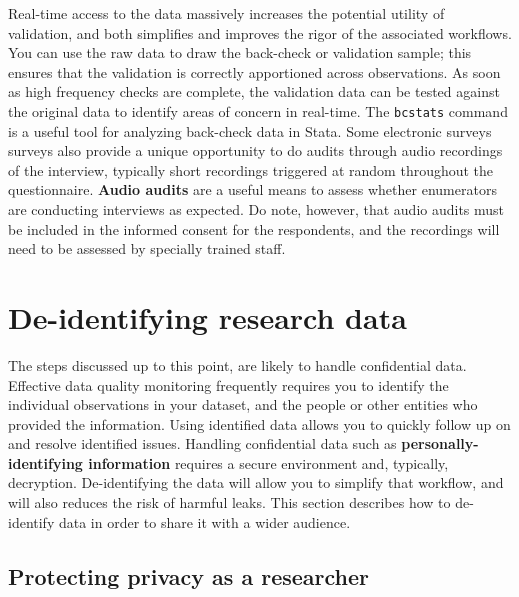 Real-time access to the data massively increases the potential utility of validation,
and both simplifies and improves the rigor of the associated workflows.
You can use the raw data to draw the back-check or validation sample;
this ensures that the validation is correctly apportioned across observations.
As soon as high frequency checks are complete, 
the validation data can be tested against
the original data to identify areas of concern in real-time.
The \texttt{bcstats} command is a useful tool for analyzing back-check data in Stata.
Some electronic surveys surveys also provide a unique opportunity
to do audits through audio recordings of the interview,
typically short recordings triggered at random throughout the questionnaire.
\textbf{Audio audits} are a useful means to assess whether enumerators are conducting interviews as expected.
Do note, however, that audio audits must be included in the informed consent for the respondents,
and the recordings will need to be assessed by specially trained staff.


\section{De-identifying research data}

The steps discussed up to this point, are likely to handle confidential data.
Effective data quality monitoring
frequently requires you to identify the individual observations in your dataset,
and the people or other entities who provided the information.
Using identified data allows you to quickly follow up on and resolve identified issues.
Handling confidential data such as \textbf{personally-identifying information}
requires a secure environment and, typically, decryption.
De-identifying the data will allow you to simplify that workflow, 
and will also reduces the risk of harmful leaks.
This section describes how to de-identify data in order to share it with a wider audience.

\subsection{Protecting privacy as a researcher}


